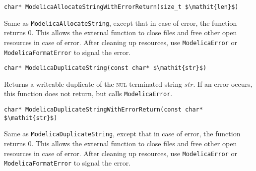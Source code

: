 \begin{functiondefinition}[ModelicaAllocateStringWithErrorReturn]
\begin{synopsis}[C]\begin{lstlisting}
char* ModelicaAllocateStringWithErrorReturn(size_t $\mathit{len}$)
\end{lstlisting}\end{synopsis}
\begin{semantics}
Same as \lstinline[language=C]!ModelicaAllocateString!, except that in case of error, the function returns 0.  This allows the external function to close files and free other open resources in case of error.  After cleaning up resources, use \lstinline[language=C]!ModelicaError! or \lstinline[language=C]!ModelicaFormatError! to signal the error.
\end{semantics}
\end{functiondefinition}

\begin{functiondefinition}[ModelicaDuplicateString]
\begin{synopsis}[C]\begin{lstlisting}
char* ModelicaDuplicateString(const char* $\mathit{str}$)
\end{lstlisting}\end{synopsis}
\begin{semantics}
Returns a writeable duplicate of the \textsc{nul}-terminated string $\mathit{str}$.  If an error occurs, this function does not return, but calls \lstinline[language=C]!ModelicaError!.
\end{semantics}
\end{functiondefinition}

\begin{functiondefinition}[ModelicaDuplicateStringWithErrorReturn]
\begin{synopsis}[C]\begin{lstlisting}
char* ModelicaDuplicateStringWithErrorReturn(const char* $\mathit{str}$)
\end{lstlisting}\end{synopsis}
\begin{semantics}
Same as \lstinline[language=C]!ModelicaDuplicateString!, except that in case of error, the function returns 0.  This allows the external function to close files and free other open resources in case of error. After cleaning up resources, use \lstinline[language=C]!ModelicaError! or \lstinline[language=C]!ModelicaFormatError! to signal the error.
\end{semantics}
\end{functiondefinition}

